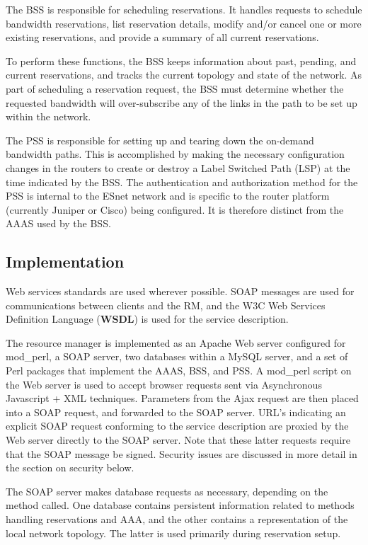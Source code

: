 \documentclass[conference]{IEEEtran}
\begin{document}
The BSS is responsible for scheduling reservations.  It handles
requests to schedule bandwidth reservations, list reservation details,
modify and/or cancel one or more existing reservations, and provide a summary
of all current reservations.

To perform these functions, the BSS keeps information about past,
pending, and current reservations, and tracks the current topology and state of
the network.  As part of scheduling a reservation request, the BSS must
determine whether the requested bandwidth will over-subscribe any of the links
in the path to be set up within the network.

The PSS is responsible for setting up and tearing down the on-demand bandwidth 
paths. This is accomplished by making the necessary configuration changes in 
the routers to create or destroy a Label Switched Path (LSP) at the
time
indicated by the BSS. The authentication and authorization method for the PSS 
is internal to the ESnet network and is specific to the router platform 
(currently Juniper or Cisco) being configured.  It is therefore distinct from 
the AAAS used by the BSS.

\subsection{Implementation}

Web services standards are used wherever possible.  SOAP messages are
used for communications between clients and the RM, and 
the W3C Web Services Definition Language (\textbf{WSDL}) is used for the service description.
 
The resource manager is implemented as an Apache Web server configured for
mod\_perl, a SOAP server, two databases within a MySQL server, and a set of 
Perl packages that implement the AAAS, BSS, and PSS.  A mod\_perl script on
the Web server is used to accept browser requests sent via Asynchronous
Javascript + XML \cite{Ajax} techniques.
Parameters from the Ajax request are then placed into a SOAP request, and
forwarded to the SOAP server.
URL's indicating an explicit SOAP request conforming to the service 
description are proxied by the Web server directly to the SOAP server.
Note that these latter requests require that the SOAP message be signed.
Security issues are discussed in more detail in the section on security below.

The SOAP server makes database requests as necessary, depending on the
method called.  One database 
contains persistent information related to methods handling 
reservations and AAA, and the other contains a representation of the local
network topology.  The latter is used primarily during reservation setup.
\end{document}
